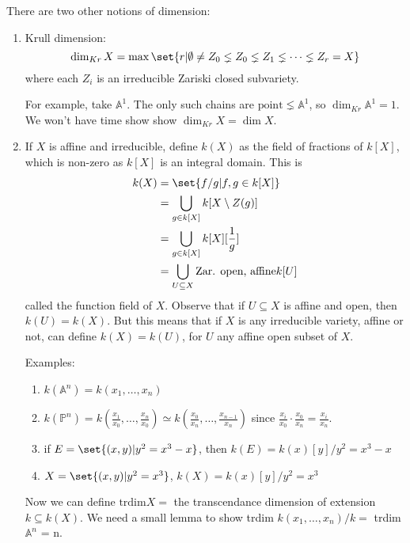 \documentclass{article}
\newcommand{\A}{\mathbb{A}}
\newcommand{\proj}{\mathbb{P}}
\begin{document}
There are two other notions of dimension:
\begin{enumerate}[label=(\arabic*)]
    \item Krull dimension:
        \begin{equation*}
            \dim_{Kr} X = \max\set{r | \emptyset \neq Z_0 \lneq Z_0 \lneq Z_1 \lneq \dotsb \lneq Z_r = X}
        \end{equation*}
        where each $Z_i$ is an irreducible Zariski closed subvariety.

        For example, take $\A^1$. The only such chains are $\text{point} \lneq \A^1$, so $\dim_{Kr} \A^1 = 1$.
        We won't have time show show $\dim_{Kr} X = \dim X$.
    \item If $X$ is affine and irreducible, define $k(X)$ as the field of fractions of $k[X]$, which is non-zero as $k[X]$ is an integral domain.
        This is
        \begin{align*}
            k(X) &= \set{f/g | f, g \in k[X]} \\
                 &= \bigcup_{g \in k[X]} k[X \setminus Z(g)] \\
                 &= \bigcup_{g \in k[X]} k[X][\frac{1}{g}] \\
                 &= \bigcup_{U \subseteq X} \text{Zar. open, affine} k[U]
        \end{align*}
        called the function field of $X$.
        Observe that if $U \subseteq X$ is affine and open, then $k(U) = k(X)$.
        But this means that if $X$ is any irreducible variety, affine or not, can define $k(X) = k(U)$, for $U$ any affine open subset of $X$.

        Examples:
        \begin{enumerate}[label=(\roman*)]
            \item $k(\A^n) = k(x_1, \dotsc, x_n)$
            \item $k(\proj^n) = k(\frac{x_1}{x_0}, \dotsc, \frac{x_n}{x_0}) \simeq k(\frac{x_0}{x_n}, \dotsc, \frac{x_{n-1}}{x_n})$ since $\frac{x_i}{x_0} \cdot \frac{x_0}{x_n} = \frac{x_i}{x_n}$.
            \item if $E = \set{(x, y) | y^2 = x^3 - x}$, then $k(E) = k(x)[y]/y^2 = x^3 - x$
            \item $X = \set{(x, y) | y^2 = x^3}$, $k(X) = k(x)[y] / y^2 = x^3$
        \end{enumerate}

        Now we can define $\text{trdim} X =$ the transcendance dimension of extension $k \subseteq k(X)$.
        We need a small lemma to show trdim $k(x_1, \dotsc, x_n)/k = $ trdim $\A^n$ = n.
\end{enumerate}
\end{document}
